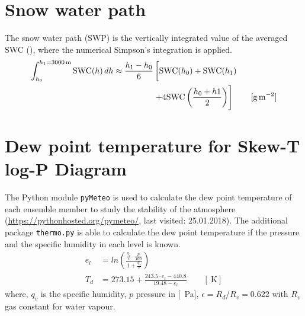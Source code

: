 \section{Snow water path}
The snow water path (SWP) is the vertically integrated value of the averaged SWC (), where the numerical Simpson's integration is applied.  
\begin{equation}
\begin{split}
\int_{h_0}^{h_1=\SI{3000}{\metre}} \text{SWC}(h) \, dh \approx 
\frac{h_1 - h_0}{6}  & \left[ \text{SWC}(h_0)    + \text{SWC}(h_1)   \vphantom{\frac{h_0 + h1}{2}} \right. \\ 
& \left. + 4 \text{SWC}\left(\frac{h_0 + h1}{2}\right)  
\right] \qquad [\SI{}{\g\per\square\meter}]
\end{split}
\label{eq:chi}
\end{equation}




\section{Dew point temperature for Skew-T log-P Diagram}
The Python module \texttt{pyMeteo} is used to calculate the dew point temperature of each ensemble member to study the stability of the atmosphere (\url{https://pythonhosted.org/pymeteo/}, last visited: 25.01.2018). The additional package \texttt{thermo.py} is able to calculate the dew point temperature if the pressure and the specific humidity in each level is known. 
\begin{align}
e_l & = ln\left( \frac{\frac{q_v}{\epsilon} \cdot \frac{p}{100}}{1 + \frac{q_v}{\epsilon}} \right) \\
T_d & = 273.15 + \frac{243.5 \cdot e_l -440.8}{19.48 -e_l} \qquad [\SI{}{\kelvin}]
\end{align}
where, $q_v$ is the specific humidity, $p$ pressure in [\SI{}{\Pa}], $\epsilon = R_d / R_v = 0.622$ with $R_v$ gas constant for water vapour.